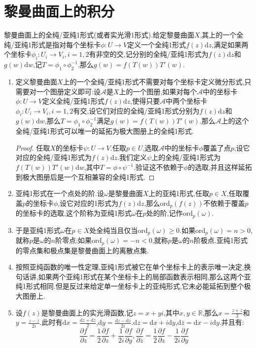\newpage
\section{黎曼曲面上的积分}

黎曼曲面上的全纯/亚纯1形式(或者实光滑1形式).给定黎曼曲面$X$,其上的一个全纯/亚纯1形式是指对每个坐标卡$\phi:U\to V$定义一个全纯1形式$f(z)\mathrm{d}z$,满足如果两个坐标卡$\phi_i:U_i\to V_i,i=1,2$有非空的交,记分别的全纯/亚纯1形式为$f(z)\mathrm{d}z$和$g(w)\mathrm{d}w$,记$T=\phi_1\circ\phi_2^{-1}$,那么$g(w)=f(T(w))T'(w)$.
\begin{enumerate}
	\item 定义黎曼曲面$X$上的一个全纯/亚纯1形式不需要对每个坐标卡定义微分形式,只需要对一个图册定义即可:设$\mathscr{A}$是$X$上的一个图册,如果对每个$\mathscr{A}$中的坐标卡$\phi:U\to V$定义全纯/亚纯1形式$f(z)\mathrm{d}z$,使得只要$\mathscr{A}$中两个坐标卡$\phi_i:U_i\to V_i,i=1,2$有交,设它们对应的全纯/亚纯1形式分别为$f(z)\mathrm{d}z$和$g(w)\mathrm{d}w$,那么$T=\phi_1\circ\phi^{-1}_2$满足$g(w)=f(T(w))T'(w)$.那么$\mathscr{A}$上的这个全纯/亚纯1形式可以唯一的延拓为极大图册上的全纯1形式.
	\begin{proof}
		
		任取$X$的坐标卡$\psi:U\to V$.任取$p\in U$,选取$\mathscr{A}$中的坐标卡$\phi$覆盖了点$p$,设它对应的全纯/亚纯1形式为$f(z)\mathrm{d}z$.我们定义$\psi$上的全纯/亚纯1形式为$f(T(w))T'(w)\mathrm{d}w$,其中$T=\phi\circ\psi^{-1}$.验证这不依赖于$\phi$的选取,并且这样延拓到极大图册后是一个互相兼容的全纯1形式.
	\end{proof}
    \item 亚纯1形式在一个点处的阶.设$\omega$是黎曼曲面$X$上的亚纯1形式,任取$p\in X$,任取覆盖$p$的坐标卡$\phi$,设它对应的1形式为$f(z)\mathrm{d}z$,那么$\mathrm{ord}_p(f(z))$不依赖于覆盖$p$的坐标卡的选取,这个阶称为亚纯1形式$\omega$在$p$处的阶,记作$\mathrm{ord}_p(\omega)$.
    \item 于是亚纯1形式$\omega$在$p\in X$处全纯当且仅当$\mathrm{ord}_p(\omega)\ge0$.如果$\mathrm{ord}_p(\omega)=n>0$,就称$p$是$\omega$的$n$阶零点;如果$\mathrm{ord}_p(\omega)=-n<0$,就称$p$是$\omega$的$n$阶极点.亚纯1形式的零点集和极点集是黎曼曲面上的离散点集.
    \item 按照亚纯函数的唯一性定理,亚纯1形式被它在单个坐标卡上的表示唯一决定,换句话讲,如果两个亚纯1形式在某个坐标卡上的局部函数表示相同,那么这两个亚纯1形式相同.但是反过来给定单一坐标卡上的亚纯形式,它未必能延拓到整个极大图册上.
    \item 设$f(z)$是黎曼曲面上的实光滑函数,记$z=x+yi$,其中$x,y\in\mathbb{R}$,那么$x=\frac{z+\overline{z}}{2}$和$y=\frac{z-\overline{z}}{2i}$.此时有$\mathrm{d}x=\frac{\mathrm{d}z+\mathrm{d}\overline{z}}{2}$,$\mathrm{d}y=\frac{\mathrm{d}z-\mathrm{d}\overline{z}}{2i}$.$\mathrm{d}z=\mathrm{d}x+i\mathrm{d}y$,$\mathrm{d}\overline{z}=\mathrm{d}x-i\mathrm{d}y$.并且有:
    $$\frac{\partial f}{\partial z}=\frac{1}{2}\frac{\partial f}{\partial z}+\frac{1}{2i}\frac{\partial f}{\partial y},\frac{\partial f}{\partial\overline{z}}=\frac{1}{2}\frac{\partial f}{\partial z}-\frac{1}{2i}\frac{\partial f}{\partial y}$$
    

\end{enumerate}
